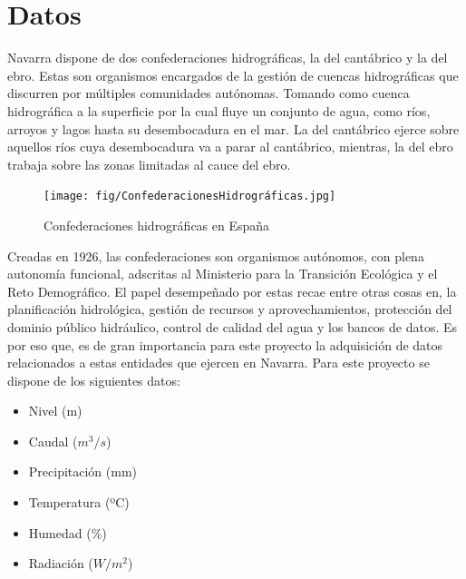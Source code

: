 \chapter[Datos]{Datos}
\label{Chap2}

Navarra dispone de dos confederaciones hidrográficas, la del cantábrico y la del ebro.\newline
\newline
Estas son organismos encargados de la gestión de cuencas hidrográficas que discurren por múltiples comunidades autónomas. Tomando como cuenca hidrográfica a la superficie por la cual fluye un conjunto de agua, como ríos, arroyos y lagos hasta su desembocadura en el mar.\newline
\newline
La del cantábrico ejerce sobre aquellos ríos cuya desembocadura va a parar al cantábrico, mientras, la del ebro trabaja sobre las zonas limitadas al cauce del ebro.

\begin{figure} [H]
	\centering
	\texttt{[image: fig/ConfederacionesHidrográficas.jpg]}
	\caption[Confederaciones hidrográficas en España]{Confederaciones hidrográficas en España}
	\label{fig:ej32}
\end{figure}

Creadas en 1926, las confederaciones son organismos autónomos, con plena autonomía funcional, adscritas al Ministerio para la Transición Ecológica y el Reto Demográfico. El papel desempeñado por estas recae entre otras cosas en, la planificación hidrológica, gestión de recursos y aprovechamientos, protección del dominio público hidráulico, control de calidad del agua y los bancos de datos.\newline
\newline
Es por eso que, es de gran importancia para este proyecto la adquisición de datos relacionados a estas entidades que ejercen en Navarra.\newline
\newline
Para este proyecto se dispone de los siguientes datos:

\begin{itemize}
	\setlength\itemsep{0.5em}
	\item Nivel (m)
	\item Caudal ($m^3/s$)
	\item Precipitación (mm)
	\item Temperatura (ºC)
	\item Humedad (\%)
	\item Radiación ($W/m^2$)
\end{itemize}

